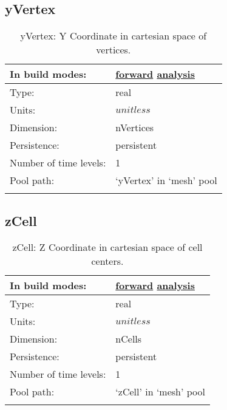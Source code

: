 \subsection[yVertex]{yVertex}
\label{subsec:var_sec_mesh_yVertex}
\begin{center}
\begin{longtable}{| p{2.0in} | p{4.0in} |}
        \hline 
        In build modes: & \hyperref[subsec:forward_var_tab_mesh]{forward} \hyperref[subsec:analysis_var_tab_mesh]{analysis} \\
        \hline 
        Type: & real \\
        \hline 
        Units: & $unitless$ \\
        \hline 
        Dimension: & nVertices \\
        \hline 
        Persistence: & persistent \\
        \hline 
        Number of time levels: & 1 \\
        \hline 
            Pool path: & `yVertex' in `mesh' pool \\
		 \hline 
    \caption{yVertex: Y Coordinate in cartesian space of vertices.}
\end{longtable}
\end{center}
\subsection[zCell]{zCell}
\label{subsec:var_sec_mesh_zCell}
\begin{center}
\begin{longtable}{| p{2.0in} | p{4.0in} |}
        \hline 
        In build modes: & \hyperref[subsec:forward_var_tab_mesh]{forward} \hyperref[subsec:analysis_var_tab_mesh]{analysis} \\
        \hline 
        Type: & real \\
        \hline 
        Units: & $unitless$ \\
        \hline 
        Dimension: & nCells \\
        \hline 
        Persistence: & persistent \\
        \hline 
        Number of time levels: & 1 \\
        \hline 
            Pool path: & `zCell' in `mesh' pool \\
		 \hline 
    \caption{zCell: Z Coordinate in cartesian space of cell centers.}
\end{longtable}
\end{center}
